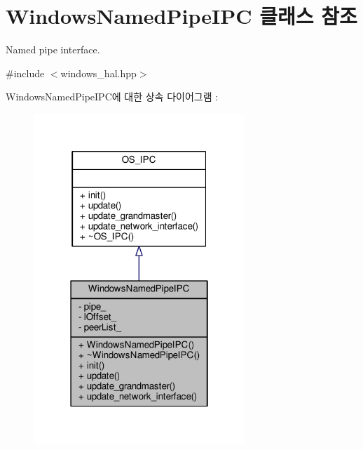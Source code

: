\hypertarget{class_windows_named_pipe_i_p_c}{}\section{Windows\+Named\+Pipe\+I\+PC 클래스 참조}
\label{class_windows_named_pipe_i_p_c}


Named pipe interface.  




{\ttfamily \#include $<$windows\+\_\+hal.\+hpp$>$}



Windows\+Named\+Pipe\+I\+P\+C에 대한 상속 다이어그램 \+: 
\nopagebreak
\begin{figure}[H]
\begin{center}
\leavevmode
\includegraphics[width=226pt]{class_windows_named_pipe_i_p_c__inherit__graph}
\end{center}
\end{figure}


